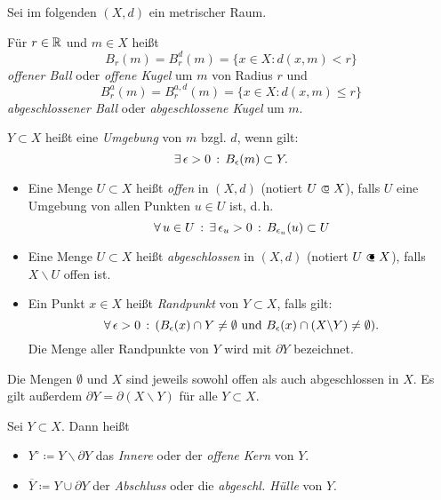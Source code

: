 \documentclass{cheat-sheet}
\begin{document}
\begin{nota}
  Sei im folgenden $(X, d)$ ein metrischer Raum.
\end{nota}


\begin{defn}
  Für $r \in \mathbb{R}$ und $m \in X$ heißt
  \[ B_r(m) = B_r^d(m) = \{ x \in X : d(x, m) < r \} \]
  \emph{offener Ball} oder \emph{offene Kugel} um $m$ von Radius $r$ und
  \[ B_r^a(m) = B_r^{a,d}(m) = \{ x \in X : d(x, m) \le r \} \]
  \emph{abgeschlossener Ball} oder \emph{abgeschlossene Kugel} um $m$.
\end{defn}

\begin{defn}
  $Y \subset X$ heißt eine \emph{Umgebung} von $m$ bzgl. $d$, wenn gilt:
  \[ \exists \, {\epsilon > 0} \,:\, B_{\epsilon}(m) \subset Y. \]
\end{defn}

\begin{defn}
  \begin{itemize}
    \item Eine Menge $U \subset X$ heißt \emph{offen} in $(X, d)$ (notiert $U \opn X$), falls $U$ eine Umgebung von allen Punkten $u \in U$ ist, d.\,h.
    \[ \forall \, {u \in U} \,:\, \exists \, {\epsilon_u > 0} \,:\, B_{\epsilon_u}(u) \subset U \]
    \item Eine Menge $U \subset X$ heißt \emph{abgeschlossen} in $(X, d)$ (notiert $U \cls X$), falls $X \backslash U$ offen ist.
    \item Ein Punkt $x \in X$ heißt \emph{Randpunkt} von $Y \subset X$, falls gilt:
    \[ \forall \, {\epsilon > 0} \,:\, ( B_{\epsilon}(x) \cap Y \not= \emptyset \text{ und } B_{\epsilon}(x) \cap (X \backslash Y) \not= \emptyset). \]
    Die Menge aller Randpunkte von $Y$ wird mit \emph{$\partial Y$} bezeichnet.
  \end{itemize}
\end{defn}

\begin{bem}
  Die Mengen $\emptyset$ und $X$ sind jeweils sowohl offen als auch abgeschlossen in $X$. Es gilt außerdem $\partial Y = \partial (X \backslash Y)$ für alle $Y \subset X$.
\end{bem}

\begin{defn}
  Sei $Y \subset X$. Dann heißt
  \begin{itemize}
    \item $Y^{\circ} \coloneqq Y \backslash \partial Y$ das \emph{Innere} oder der \emph{offene Kern} von $Y$.
    \item $\overline{Y} \coloneqq Y \cup \partial Y$ der \emph{Abschluss} oder die \emph{abgeschl. Hülle} von $Y$.
  \end{itemize}
\end{defn}
\end{document}
